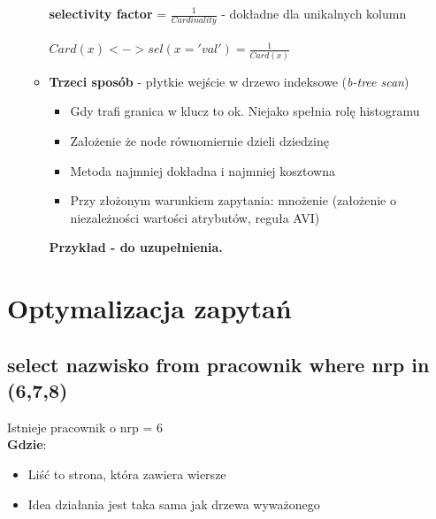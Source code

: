 \documentclass[a4paper,twoside]{article}
\begin{document}
\begin{itemize}
\begin{itemize}
  			\textbf{selectivity factor} = \(\frac{1}{Cardinality}\) - dokładne dla unikalnych kolumn\\\\
  			\(Card(x)<->sel(x='val')=\frac{1}{Card(x)}\)
  			\item \textbf{Trzeci sposób} - płytkie wejście w drzewo indeksowe (\textit{b-tree scan})
  			\begin{itemize}
  				\item Gdy trafi granica w klucz to ok. Niejako spełnia rolę histogramu
  				\item Założenie że node równomiernie dzieli dziedzinę
  				\item Metoda najmniej dokładna i najmniej kosztowna
  				\item Przy złożonym warunkiem zapytania: mnożenie (założenie o niezależności wartości atrybutów, reguła AVI)
  			\end{itemize}
  			\textbf{Przykład - do uzupełnienia.}
		\end{itemize}
  	\end{itemize}
  	
  	\section*{Optymalizacja zapytań} \noindent 
  	\subsection*{select nazwisko from pracownik where nrp in (6,7,8)} 
  	Istnieje pracownik o nrp = 6\\
  	\textbf{Gdzie}:
  	\begin{itemize}
  		\item Liść to strona, która zawiera wiersze
  		\item Idea działania jest taka sama jak drzewa wyważonego
  	\end{itemize}
\end{document}
